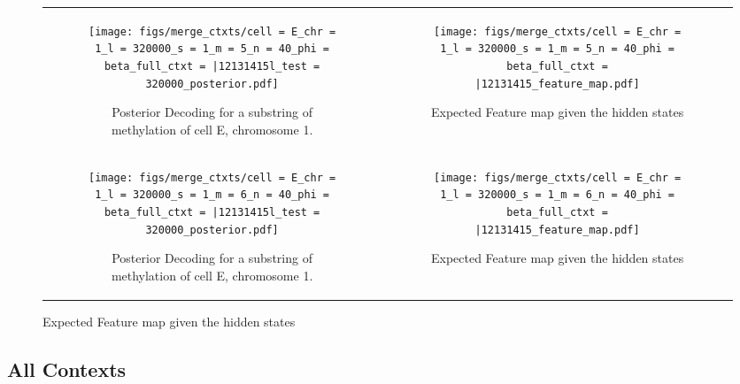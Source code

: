\documentclass{article}
\begin{document}
    \begin{figure}[H]
        \begin{tabular}{cc}
          \begin{subfigure}[t]{0.4\textwidth}
            \texttt{[image: figs/merge\_ctxts/cell = E\_chr = 1\_l = 320000\_s = 1\_m = 5\_n = 40\_phi = beta\_full\_ctxt = |12131415l\_test = 320000\_posterior.pdf]}
            \caption{Posterior Decoding for a substring of methylation of cell E, chromosome 1.}
          \end{subfigure}
          &
          \begin{subfigure}[t]{0.4\textwidth}
            \texttt{[image: figs/merge\_ctxts/cell = E\_chr = 1\_l = 320000\_s = 1\_m = 5\_n = 40\_phi = beta\_full\_ctxt = |12131415\_feature\_map.pdf]}
            \caption{Expected Feature map given the hidden states}
          \end{subfigure}
      \\
      \begin{subfigure}[t]{0.4\textwidth}
        \texttt{[image: figs/merge\_ctxts/cell = E\_chr = 1\_l = 320000\_s = 1\_m = 6\_n = 40\_phi = beta\_full\_ctxt = |12131415l\_test = 320000\_posterior.pdf]}
        \caption{Posterior Decoding for a substring of methylation of cell E, chromosome 1.}
      \end{subfigure}
      &
      \begin{subfigure}[t]{0.4\textwidth}
        \texttt{[image: figs/merge\_ctxts/cell = E\_chr = 1\_l = 320000\_s = 1\_m = 6\_n = 40\_phi = beta\_full\_ctxt = |12131415\_feature\_map.pdf]}
        \caption{Expected Feature map given the hidden states}
      \end{subfigure}
    \end{tabular}
\end{figure}

\subsection{All Contexts}
\end{document}
